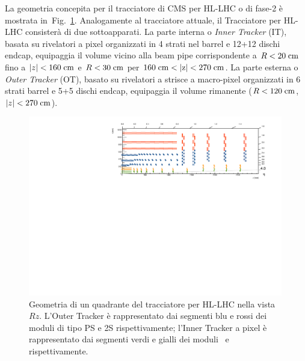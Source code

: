 La geometria concepita per il tracciatore di CMS per HL-LHC o di fase-2 \`e mostrata in~Fig.~\ref{fig:TkLayoutPhaseII}. Analogamente al tracciatore attuale, il Tracciatore per HL-LHC consister\`a di due sottoapparati. La parte interna o {\em Inner Tracker} (IT), basata su rivelatori a pixel organizzati in 4 strati nel barrel e 12+12 dischi endcap, equipaggia il volume vicino alla beam pipe corrispondente a $R<20\rm \; cm$ fino a $|z|<160\rm \; cm$ e $R<30\rm \; cm$ per $160\cm<|z|<270\cm$. La parte esterna o {\em Outer Tracker} (OT), basato su rivelatori a strisce a macro-pixel organizzati in 6 strati barrel e 5+5 dischi endcap, equipaggia il volume rimanente ($R<120\rm \; cm$, $|z|<270\rm \; cm$).
\begin{figure}
\centering
\includegraphics[width=0.99\textwidth]{Immagini/fullLayout000.pdf}
\caption{Geometria di un quadrante del tracciatore per HL-LHC nella vista $Rz$. L'Outer Tracker \`e rappresentato dai segmenti blu e rossi dei moduli di tipo PS e 2S rispettivamente; l'Inner Tracker a pixel \`e rappresentato dai segmenti verdi e gialli dei moduli \modud\ e \moddd\, rispettivamente.}
\label{fig:TkLayoutPhaseII}
\end{figure}

